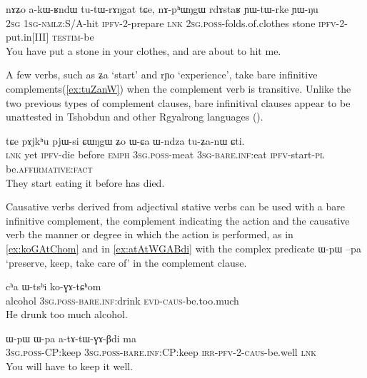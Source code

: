 \documentclass[oldfontcommands,oneside,a4paper,11pt]{article}
\newcommand{\ipa}[1]{{\phon #1}} %
\begin{document}
 \begin{exe}
\ex \label{ex:akWRndW}
\gll
\ipa{nɤʑo}  	\ipa{a-kɯ-ʁndɯ}  	\ipa{tu-tɯ-rɤŋgat}  	\ipa{tɕe,}  	\ipa{nɤ-pʰɯŋgɯ}  	\ipa{rdɤstaʁ}  	\ipa{ɲɯ-tɯ-rke}  	\ipa{ɲɯ-ŋu}  \\
\textsc{2sg} \textsc{1sg-nmlz}:S/A-hit \textsc{ipfv}-2-prepare \textsc{lnk} \textsc{2sg.poss}-folds.of.clothes stone \textsc{ipfv}-2-put.in[III] \textsc{testim}-be \\
\glt You have put a stone in your clothes, and are about to hit me.
\end{exe}

A few verbs, such as \ipa{ʑa} `start' and \ipa{rɲo} `experience', take bare infinitive complements(\ref{ex:tuZanW}) when the complement verb is transitive. Unlike the two previous types of complement clauses, bare infinitival clauses appear to be unattested in Tshobdun and other Rgyalrong languages (\citealt{sun12complementation}).

 \begin{exe}
\ex \label{ex:tuZanW}
\gll
\ipa{tɕe}  	\ipa{pɤjkʰu}  	\ipa{pjɯ-si}  	\ipa{ɕɯŋgɯ}  	\ipa{ʑo}  	\ipa{ɯ-ɕa}  	\ipa{ɯ-ndza}  	\ipa{tu-ʑa-nɯ}  	\ipa{ɕti.}  \\
\textsc{lnk} yet \textsc{ipfv}-die before \textsc{emph} \textsc{3sg.poss}-meat \textsc{3sg-bare.inf}:eat \textsc{ipfv}-start-\textsc{pl}  be.\textsc{affirmative}:\textsc{fact} \\
 \glt They start eating it before has died.
\end{exe}

Causative verbs derived from adjectival stative verbs can be used with a bare infinitive complement, the complement indicating the action and the causative verb the manner or degree in which the action is performed, as in \ref{ex:koGAtChom} and in \ref{ex:atAtWGABdi} with the complex predicate \ipa{ɯ-pɯ} \ipa{--pa} `preserve, keep, take care of' in the complement clause.

 \begin{exe}
\ex \label{ex:koGAtChom}
\gll
\ipa{cʰa} \ipa{ɯ-tsʰi} \ipa{ko-ɣɤ-tɕʰom} \\
alcohol \textsc{3sg.poss}-\textsc{bare.inf}:drink \textsc{evd-caus}-be.too.much \\
\glt He drunk too much alcohol.
\end{exe}
 \begin{exe}
\ex \label{ex:atAtWGABdi}
\gll
\ipa{ɯ-pɯ}  	\ipa{ɯ-pa}  	\ipa{a-tɤ-tɯ-ɣɤ-βdi}  	\ipa{ma}  \\
\textsc{3sg.poss}-CP:keep \textsc{3sg.poss}-\textsc{bare.inf}:CP:keep \textsc{irr-pfv-2-caus}-be.well \textsc{lnk} \\
\glt You will have to keep it well.
\end{exe}
\end{document}
